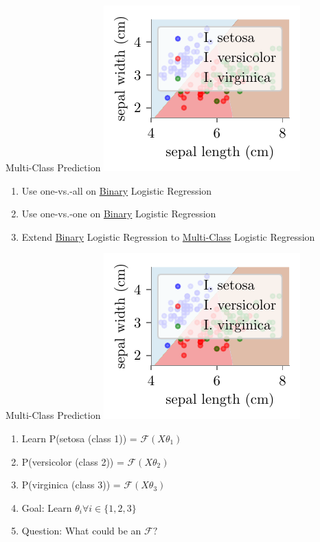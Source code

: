 \documentclass{beamer}
\begin{document}
\begin{frame}{Multi-Class Prediction}
\includegraphics{../figures/logistic-regression/logisitic-iris-prediction.pdf}
\pause \begin{enumerate}
\item Use one-vs.-all on \underline{Binary} Logistic Regression
\item Use one-vs.-one on \underline{Binary} Logistic Regression
\item Extend \underline{Binary} Logistic Regression to \underline{Multi-Class} Logistic Regression
\end{enumerate}
\end{frame}

\begin{frame}{Multi-Class Prediction}
\includegraphics[scale=0.8]{../figures/logistic-regression/logisitic-iris-prediction.pdf}
\pause \begin{enumerate}
	\item Learn P(setosa (class 1)) = $\mathcal{F}({X\theta_1})$
	\item P(versicolor (class 2)) = $\mathcal{F}({X\theta_2})$
	\item P(virginica (class 3)) = $\mathcal{F}({X\theta_3})$
	\item Goal: Learn $\theta_i \forall i \in \{1, 2, 3\}$
	\item Question: What could be an $\mathcal{F}?$

\end{enumerate}


\end{frame}
\end{document}
